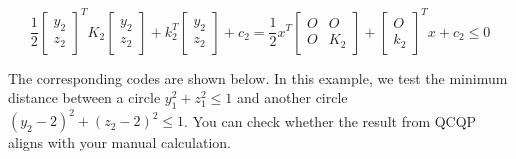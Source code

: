 \documentclass[
]{book}
\theoremstyle{definition}
\theoremstyle{definition}
\theoremstyle{definition}
\theoremstyle{definition}
\theoremstyle{remark}
\begin{document}
\begin{enumerate}
\begin{equation*}
     \frac{1}{2} \begin{bmatrix} y_2 \\ z_2 \end{bmatrix}^T K_2 \begin{bmatrix} y_2 \\ z_2 \end{bmatrix}
    + k_2^T \begin{bmatrix} y_2 \\ z_2 \end{bmatrix} + c_2
     = \frac{1}{2} x^T \begin{bmatrix}
    O & O \\ O & K_2
     \end{bmatrix} + \begin{bmatrix}
    O \\ k_2
     \end{bmatrix}^T x + c_2 \le 0
  \end{equation*}
\end{enumerate}

The corresponding codes are shown below. In this example, we test the minimum distance between a circle \(y_1^2 + z_1^2 \le 1\) and another circle \((y_2 - 2)^2 + (z_2 - 2)^2 \le 1\). You can check whether the result from QCQP aligns with your manual calculation.
\end{document}
